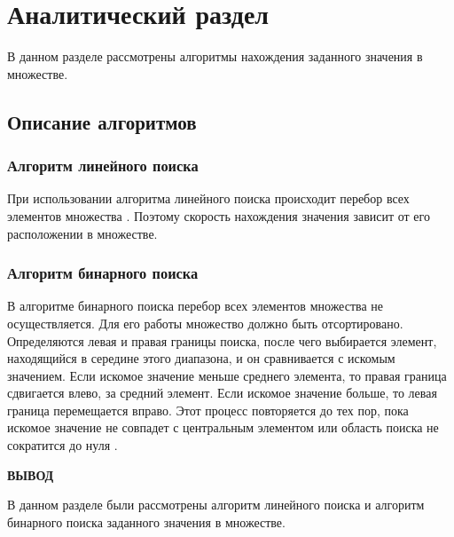 \chapter{Аналитический раздел}

В данном разделе рассмотрены алгоритмы нахождения заданного значения в множестве.

\section{Описание алгоритмов}

\subsection{Алгоритм линейного поиска}
При использовании алгоритма линейного поиска происходит перебор всех элементов множества \cite{linear_search}. Поэтому скорость нахождения значения зависит от его расположении в множестве.

\subsection{Алгоритм бинарного поиска}
В алгоритме бинарного поиска перебор всех элементов множества не осуществляется. Для его работы множество должно быть отсортировано. Определяются левая и правая границы поиска, после чего выбирается элемент, находящийся в середине этого диапазона, и он сравнивается с искомым значением. Если искомое значение меньше среднего элемента, то правая граница сдвигается влево, за средний элемент. Если искомое значение больше, то левая граница перемещается вправо. Этот процесс повторяется до тех пор, пока искомое значение не совпадет с центральным элементом или область поиска не сократится до нуля \cite{binary_search}.

\clearpage
\textbf{ВЫВОД}

В данном разделе были рассмотрены алгоритм линейного поиска и алгоритм бинарного поиска заданного значения в множестве.